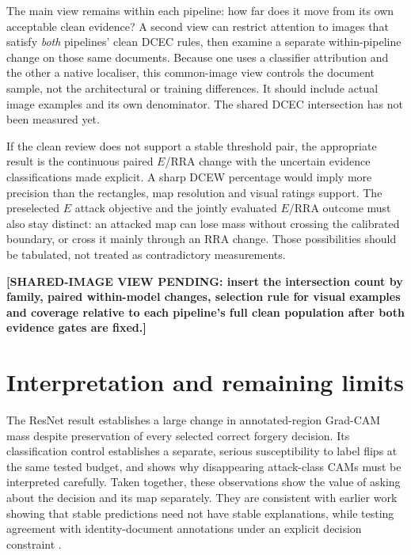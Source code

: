 The main view remains within each pipeline: how far does it move from its own acceptable clean evidence? A second view can restrict attention to images that satisfy \emph{both} pipelines' clean DCEC rules, then examine a separate within-pipeline change on those same documents. Because one uses a classifier attribution and the other a native localiser, this common-image view controls the document sample, not the architectural or training differences. It should include actual image examples and its own denominator. The shared DCEC intersection has not been measured yet.

If the clean review does not support a stable threshold pair, the appropriate result is the continuous paired $E$/RRA change with the uncertain evidence classifications made explicit. A sharp DCEW percentage would imply more precision than the rectangles, map resolution and visual ratings support. The preselected $E$ attack objective and the jointly evaluated $E$/RRA outcome must also stay distinct: an attacked map can lose mass without crossing the calibrated boundary, or cross it mainly through an RRA change. Those possibilities should be tabulated, not treated as contradictory measurements.

\par\medskip\noindent\textbf{[SHARED-IMAGE VIEW PENDING: insert the intersection count by family, paired within-model changes, selection rule for visual examples and coverage relative to each pipeline's full clean population after both evidence gates are fixed.]}\par\medskip

\section{Interpretation and remaining limits}
\label{sec:adv-interpretation}

The ResNet result establishes a large change in annotated-region Grad-CAM mass despite preservation of every selected correct forgery decision. Its classification control establishes a separate, serious susceptibility to label flips at the same tested budget, and shows why disappearing attack-class CAMs must be interpreted carefully. Taken together, these observations show the value of asking about the decision and its map separately. They are consistent with earlier work showing that stable predictions need not have stable explanations, while testing agreement with identity-document annotations under an explicit decision constraint \citep{ghorbani2019fragile,arras2022clevrxai}.

